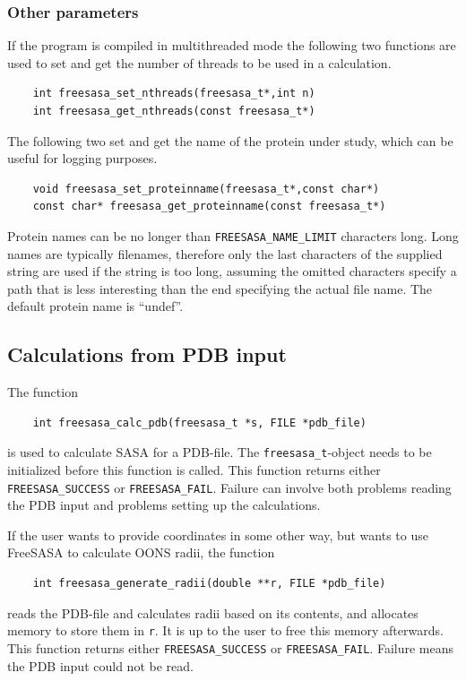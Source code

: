 \documentclass[a4paper,11pt]{article}
\begin{document}
\subsubsection{Other parameters}
If the program is compiled in multithreaded mode the following two
functions are used to set and get the number of threads to be used in
a calculation.
\begin{verbatim}
    int freesasa_set_nthreads(freesasa_t*,int n)
    int freesasa_get_nthreads(const freesasa_t*)
\end{verbatim}
The following two set and get the name of the protein under study,
which can be useful for logging purposes.
\begin{verbatim}
    void freesasa_set_proteinname(freesasa_t*,const char*)
    const char* freesasa_get_proteinname(const freesasa_t*)
\end{verbatim}
Protein names can be no longer than \verb|FREESASA_NAME_LIMIT|
characters long. Long names are typically filenames, therefore only
the last characters of the supplied string are used if the string is
too long, assuming the omitted characters specify a path that is less
interesting than the end specifying the actual file name. The default
protein name is ``undef''.

\subsection{Calculations from PDB input}

The function 
\begin{verbatim}
    int freesasa_calc_pdb(freesasa_t *s, FILE *pdb_file)
\end{verbatim}
is used to calculate SASA for a PDB-file. The
\verb|freesasa_t|-object needs to be initialized before this
function is called. This function returns either
\verb|FREESASA_SUCCESS| or \verb|FREESASA_FAIL|. Failure can
involve both problems reading the PDB input and problems setting up
the calculations.

If the user wants to provide coordinates in some other way, but wants to
use FreeSASA to calculate OONS radii, the function
\begin{verbatim}
    int freesasa_generate_radii(double **r, FILE *pdb_file)
\end{verbatim}
reads the PDB-file and calculates radii based on its contents, and
allocates memory to store them in \texttt{r}. It is up to the user to
free this memory afterwards. This function returns either
\verb|FREESASA_SUCCESS| or \verb|FREESASA_FAIL|. Failure means the
PDB input could not be read.
\end{document}
